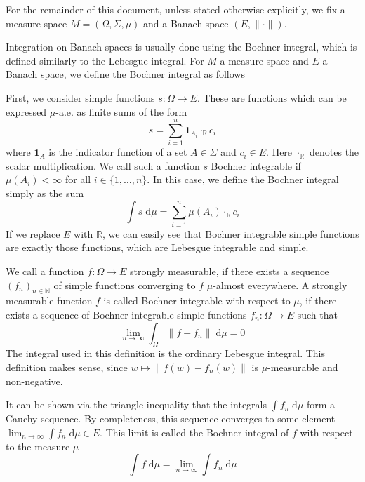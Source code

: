 \begin{remark}
	For the remainder of this document, unless stated otherwise explicitly, we fix a measure space $M = (\Omega, \Sigma, \mu)$ and a Banach space $(E, \lVert \cdot \rVert)$.
\end{remark}

Integration on Banach spaces is usually done using the Bochner integral, which is defined similarly to the Lebesgue integral. For $M$ a measure space and $E$ a Banach space, we define the Bochner integral as follows

\relax
{}\relax
\vspace{0.3cm}

First, we consider simple functions $s : \Omega \rightarrow E$. These are functions which can be expressed $\mu$-a.e. as finite sums of the form
\[
	s = \sum_{i=1}^n \mathbf{1}_{A_i} \cdot_\mathbb{R} c_i
\]
where $\mathbf{1}_A$ is the indicator function of a set $A \in \Sigma$ and $c_i \in E$. Here $\cdot_\mathbb{R}$ denotes the scalar multiplication. We call such a function $s$ Bochner integrable if $\mu(A_i) < \infty$ for all $i \in \{1,\dots,n\}$. In this case, we define the Bochner integral simply as the sum
\[
	\int s \; \textrm{d}\mu = \sum_{i=1}^n \mu(A_i) \cdot_\mathbb{R} c_i
\]
If we replace $E$ with $\mathbb{R}$, we can easily see that Bochner integrable simple functions are exactly those functions, which are Lebesgue integrable and simple.
\vspace{0.2cm}

We call a function $f : \Omega \rightarrow E$ strongly measurable, if there exists a sequence $(f_n)_{n\in\mathbb{N}}$ of simple functions converging to $f$ $\mu$-almost everywhere.
A strongly measurable function $f$ is called Bochner integrable with respect to $\mu$, if there exists a sequence of Bochner integrable simple functions $f_n : \Omega \rightarrow E$ such that
\[
	\lim_{n \to \infty} \int_\Omega \lVert f - f_n \rVert \; \textrm{d}\mu = 0
\]
The integral used in this definition is the ordinary Lebesgue integral. This definition makes sense, since $w \mapsto \lVert f(w) - f_n(w) \rVert$ is $\mu$-measurable and non-negative.

It can be shown via the triangle inequality that the integrals $\int f_n\; \textrm{d}\mu$ form a Cauchy sequence. By completeness, this sequence converges to some element $\lim_{n \to \infty} \int f_n \; \textrm{d}\mu \in E$. This limit is called the Bochner integral of $f$ with respect to the measure $\mu$
\[
	\int f \; \textrm{d}\mu = \lim_{n \to \infty} \int f_n \; \textrm{d}\mu
\]

